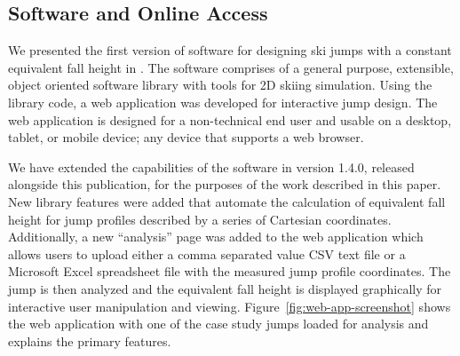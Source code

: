 \documentclass[smallextended]{svjour3}       %
\begin{document}
\subsection{Software and Online Access}
\label{sec:software}
%
We presented the first version of software for designing ski jumps with a
constant equivalent fall height in \cite{Moore2018}. The software comprises of
a general purpose, extensible, object oriented software library with tools for
2D skiing simulation. Using the library code, a web application was developed
for interactive jump design. The web application is designed for a
non-technical end user and usable on a desktop, tablet, or mobile device; any
device that supports a web browser.

We have extended the capabilities of the software in version 1.4.0, released
alongside this publication, for the purposes of the work described in this
paper. New library features were added that automate the calculation of
equivalent fall height for jump profiles described by a series of Cartesian
coordinates. Additionally, a new ``analysis'' page was added to the web
application which allows users to upload either a comma separated value CSV
text file or a Microsoft Excel spreadsheet file with the measured jump profile
coordinates. The jump is then analyzed and the equivalent fall height is
displayed graphically for interactive user manipulation and viewing.
Figure~\ref{fig:web-app-screenshot} shows the web application with one of the
case study jumps loaded for analysis and explains the primary features.
%
\end{document}
